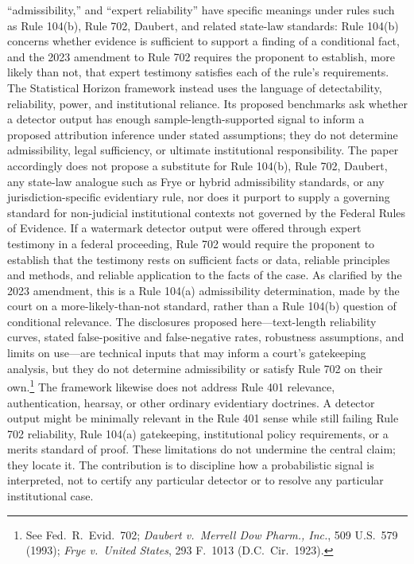 \documentclass[11pt]{article}
\begin{document}
``admissibility,'' and ``expert reliability'' have specific meanings under rules such
as Rule 104(b), Rule 702, Daubert, and related state-law standards: Rule 104(b)
concerns whether evidence is sufficient to support a finding of a conditional fact,
and the 2023 amendment to Rule 702 requires the proponent to establish, more likely
than not, that expert testimony satisfies each of the rule's requirements. The
Statistical Horizon framework instead uses the language of detectability, reliability,
power, and institutional reliance. Its proposed benchmarks ask whether a detector
output has enough sample-length-supported signal to inform a proposed attribution
inference under stated assumptions; they do not determine admissibility, legal
sufficiency, or ultimate institutional responsibility. The paper accordingly does not
propose a substitute for Rule 104(b), Rule 702, Daubert, any state-law analogue such
as Frye or hybrid admissibility standards, or any jurisdiction-specific evidentiary
rule, nor does it purport to supply a governing standard for non-judicial
institutional contexts not governed by the Federal Rules of Evidence.
If a watermark detector output were offered through expert testimony in a federal
proceeding, Rule 702 would require the proponent to establish that the testimony
rests on sufficient facts or data, reliable principles and methods, and reliable
application to the facts of the case. As clarified by the 2023 amendment, this is a
Rule 104(a) admissibility determination, made by the court on a more-likely-than-not
standard, rather than a Rule 104(b) question of conditional relevance. The
disclosures proposed here---text-length reliability curves, stated false-positive and
false-negative rates, robustness assumptions, and limits on use---are technical
inputs that may inform a court's gatekeeping analysis, but they do not determine
admissibility or satisfy Rule 702 on their own.\footnote{See Fed.\ R.\ Evid.\ 702;
\emph{Daubert v.\ Merrell Dow Pharm., Inc.}, 509 U.S.\ 579 (1993); \emph{Frye v.\
United States}, 293 F.\ 1013 (D.C.\ Cir.\ 1923).} The framework likewise does not
address Rule 401 relevance, authentication, hearsay, or other ordinary evidentiary
doctrines. A detector output might be minimally relevant in the Rule 401 sense while
still failing Rule 702 reliability, Rule 104(a) gatekeeping, institutional policy
requirements, or a merits standard of proof.
These limitations do not undermine the central claim; they locate it. The
contribution is to discipline how a probabilistic signal is interpreted, not to
certify any particular detector or to resolve any particular institutional case.
\end{document}
